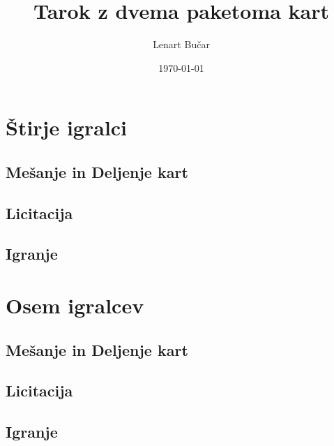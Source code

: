 \documentclass[a4paper, ]{report}
\author{Lenart Bučar}
\title{Tarok z dvema paketoma kart}
\date{\today}
\begin{document}
\part{Štirje igralci}

\chapter{Mešanje in Deljenje kart}
\chapter{Licitacija}
\chapter{Igranje}

\part{Osem igralcev}

\chapter{Mešanje in Deljenje kart}
\chapter{Licitacija}
\chapter{Igranje}
\end{document}
